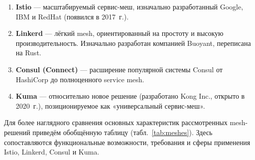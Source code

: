 \begin{enumerate}
    \item \textbf{Istio} --- масштабируемый сервис-меш, изначально разработанный Google, IBM и RedHat (появился в 2017~г.). 
    
    \item \textbf{Linkerd} --- лёгкий mesh, ориентированный на простоту и высокую производительность. Изначально разработан компанией Buoyant, переписана на Rust.
    
    \item \textbf{Consul (Connect)} --- расширение популярной системы Consul от HashiCorp до полноценного service mesh. 
    
    \item \textbf{Kuma} --- относительно новое решение (разработано Kong Inc., открыто в 2020~г.), позиционируемое как «универсальный сервис-меш». 
\end{enumerate}
Для более наглядного сравнения основных характеристик рассмотренных mesh-решений приведём обобщённую таблицу (табл.~\ref{tab:meshes}). Здесь сопоставляются функциональные возможности, требования и сферы применения Istio, Linkerd, Consul и Kuma.

